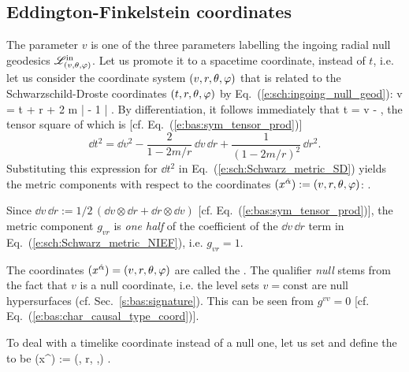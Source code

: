 \subsection{Eddington-Finkelstein coordinates} \label{s:sch:EF_coord}

The parameter $v$ is one of the three parameters labelling the
ingoing radial null geodesics $\mathscr{L}^{\rm in}_{(v,\theta,\varphi)}$.
Let us promote it to a spacetime coordinate, instead of $t$, i.e. let us
consider the coordinate system $(v,r,\theta,\varphi)$ that is related to the
Schwarzschild-Droste coordinates $(t,r,\theta,\varphi)$ by Eq.~(\ref{e:sch:ingoing_null_geod}):
\be \label{e:sch:v_t_r}
     v = t + r + 2 m \ln \left|  - 1 \right| .
\ee
By differentiation, it follows immediately that
\be \label{e:sch:dt_dv_NIEF}
    \dd t = \dd v -   ,
\ee
the tensor square of which is [cf. Eq.~(\ref{e:bas:sym_tensor_prod})]
\[
    \dd t^2 = \dd v^2 - \frac{2}{1 - 2m/r} \, \dd v \, \dd r + \frac{1}{(1 - 2m/r)^2}\, \dd r^2 .
\]
Substituting this expression for $\dd t^2$ in Eq.~(\ref{e:sch:Schwarz_metric_SD})
yields the metric components with respect to the coordinates
$(x^{\hat{\alpha}}) := (v,r,\theta,\varphi)$:
\be \label{e:sch:Schwarz_metric_NIEF}
    .
\ee

\begin{remark}
Since $\dd v\, \dd r := 1/2 \, (\dd v\otimes \dd r +  \dd r\otimes\dd v)$
[cf. Eq.~(\ref{e:bas:sym_tensor_prod})], the metric component $g_{vr}$
is \emph{one half} of the coefficient of the $\dd v\, \dd r$ term
in Eq.~(\ref{e:sch:Schwarz_metric_NIEF}), i.e.
$g_{vr} = 1$.
\end{remark}

The coordinates $(x^{\hat{\alpha}}) = (v,r,\theta,\varphi)$ are called the
. The qualifier \emph{null} stems from the fact that
$v$ is a null coordinate, i.e. the level sets $v = \mathrm{const}$ are null hypersurfaces
(cf. Sec.~\ref{s:bas:signature}). This can be seen from $g^{vv} = 0$ [cf. Eq.~(\ref{e:bas:char_causal_type_coord})].

To deal with a timelike coordinate instead of a null one, let us set
\be  \label{e:sch:ti_v_r}
     \iff {}
\ee
and define the 
to be
\be
    (x^{\tilde{\alpha}}) := (\ti, r, \th,\ph) .
\ee

